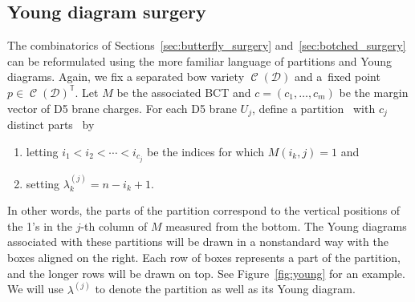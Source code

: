 \documentclass[pdftex]{sigma}
\numberwithin{equation}{section}
\newcommand{\brane}{\mathcal D}
\newcommand{\torus}{\mathbb T}
\DeclareMathOperator{\bowvar}{\mathcal C}
\begin{document}
\subsection{Young diagram surgery}
The combinatorics of Sections~\ref{sec:butterfly_surgery} and~\ref{sec:botched_surgery} can be reformulated using the more familiar language of partitions and Young diagrams. Again, we fix a separated bow variety $\bowvar(\brane)$ and a~fixed point~${p\in \bowvar(\brane)^\torus}$. Let $M$ be the associated BCT and $c=(c_1, \dots , c_m)$ be the margin vector of D5 brane charges. For each D5 brane $U_j$, define a partition~ with $c_j$ distinct parts~ by
\begin{enumerate}\itemsep=0pt
\item[(1)] letting $i_1 < i_2 < \cdots < i_{c_j}$ be the indices for which $M(i_k, j) = 1$ and
\item[(2)] setting $\lambda^{(j)}_k = n - i_k + 1$.
\end{enumerate}
In other words, the parts of the partition correspond to the vertical positions of the 1's in the $j$-th column of $M$ measured from the bottom. The Young diagrams associated with these partitions will be drawn in a nonstandard way with the boxes aligned on the right. Each row of boxes represents a part of the partition, and the longer rows will be drawn on top. See Figure~\ref{fig:young} for an example. We will use $\lambda^{(j)}$ to denote the partition as well as its Young diagram.
\end{document}
